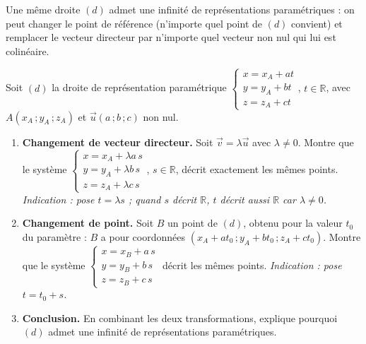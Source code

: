 \documentclass[11pt]{article}
\begin{document}
\begin{propriete}
Une même droite $(d)$ admet une infinité de représentations paramétriques : on peut changer le point de référence (n'importe quel point de $(d)$ convient) et remplacer le vecteur directeur par n'importe quel vecteur non nul qui lui est colinéaire.
\end{propriete}

\begin{experience}
Soit $(d)$ la droite de représentation paramétrique $\begin{cases} x = x_A + at \\ y = y_A + bt \\ z = z_A + ct \end{cases}$, $t \in \mathbb{R}$, avec $A(x_A\,;y_A\,;z_A)$ et $\vec{u}(a\,;b\,;c)$ non nul.
\begin{enumerate}
\item \textbf{Changement de vecteur directeur.} Soit $\vec{v} = \lambda \vec{u}$ avec $\lambda \neq 0$. Montre que le système $\begin{cases} x = x_A + \lambda a\, s \\ y = y_A + \lambda b\, s \\ z = z_A + \lambda c\, s \end{cases}$, $s \in \mathbb{R}$, décrit exactement les mêmes points. \emph{Indication : pose $t = \lambda s$ ; quand $s$ décrit $\mathbb{R}$, $t$ décrit aussi $\mathbb{R}$ car $\lambda \neq 0$.}
\item \textbf{Changement de point.} Soit $B$ un point de $(d)$, obtenu pour la valeur $t_0$ du paramètre : $B$ a pour coordonnées $(x_A + a t_0\,;y_A + b t_0\,;z_A + c t_0)$. Montre que le système $\begin{cases} x = x_B + a\,s \\ y = y_B + b\,s \\ z = z_B + c\,s \end{cases}$ décrit les mêmes points. \emph{Indication : pose $t = t_0 + s$.}
\item \textbf{Conclusion.} En combinant les deux transformations, explique pourquoi $(d)$ admet une infinité de représentations paramétriques.
\end{enumerate}
\end{experience}
\end{document}
